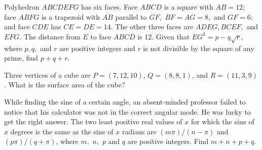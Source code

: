 %	




\begin{question}[name={2002 AIME I, \href{https://artofproblemsolving.com/community/c4p378399}{Problem 15}}]
	Polyhedron $ABCDEFG$ has six faces. Face $ABCD$ is a square with $AB=12;$ face $ABFG$ is a trapezoid with $\overline{AB}$ parallel to $\overline{GF},$ $BF=AG=8,$ and $GF=6;$ and face $CDE$ has $CE=DE=14.$ The other three faces are $ADEG, BCEF,$ and $EFG.$ The distance from $E$ to face $ABCD$ is 12. Given that $EG^2=p-q\sqrt{r},$ where $p, q,$ and $r$ are positive integers and $r$ is not divisible by the square of any prime, find $p+q+r.$	
\end{question}


%	








\begin{question}[name={2002 AIME II, \href{https://artofproblemsolving.com/community/c4p714625}{Problem 2}}]
	Three vertices of a cube are $P=(7,12,10)$, $Q=(8,8,1)$, and $R=(11,3,9)$. What is the surface area of the cube?
\end{question}


%	













\begin{question}[name={2002 AIME II, \href{https://artofproblemsolving.com/community/c4p714637}{Problem 10}}]
	While finding the sine of a certain angle, an absent-minded professor failed to notice that his calculator was not in the correct angular mode. He was lucky to get the right answer. The two least positive real values of $x$ for which the sine of $x$ degrees is the same as the sine of $x$ radians are $(m\pi)/(n-\pi)$ and $(p\pi)/(q+\pi)$, where $m,$ $n,$ $p$ and $q$ are positive integers. Find $m+n+p+q$.
\end{question}


